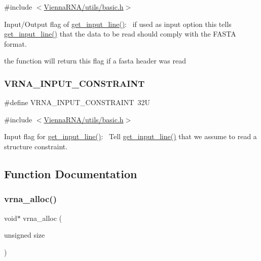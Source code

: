 {\ttfamily \#include $<$\mbox{\hyperlink{utils_2basic_8h}{Vienna\+R\+N\+A/utils/basic.\+h}}$>$}



Input/\+Output flag of \mbox{\hyperlink{group__utils_ga8ef1835eb83f542396f59f0b205965e5}{get\+\_\+input\+\_\+line()}}\+:~\newline
if used as input option this tells \mbox{\hyperlink{group__utils_ga8ef1835eb83f542396f59f0b205965e5}{get\+\_\+input\+\_\+line()}} that the data to be read should comply with the F\+A\+S\+TA format. 

the function will return this flag if a fasta header was read \mbox{\label{group__utils_gac08a9df45b9721b97a47dbfe7a6e5f85}} 
\subsubsection{\texorpdfstring{VRNA\_INPUT\_CONSTRAINT}{VRNA\_INPUT\_CONSTRAINT}}
{\footnotesize\ttfamily \#define V\+R\+N\+A\+\_\+\+I\+N\+P\+U\+T\+\_\+\+C\+O\+N\+S\+T\+R\+A\+I\+NT~32U}



{\ttfamily \#include $<$\mbox{\hyperlink{utils_2basic_8h}{Vienna\+R\+N\+A/utils/basic.\+h}}$>$}



Input flag for \mbox{\hyperlink{group__utils_ga8ef1835eb83f542396f59f0b205965e5}{get\+\_\+input\+\_\+line()}}\+:~\newline
Tell \mbox{\hyperlink{group__utils_ga8ef1835eb83f542396f59f0b205965e5}{get\+\_\+input\+\_\+line()}} that we assume to read a structure constraint. 



\subsection{Function Documentation}
\mbox{\label{group__utils_gaf37a0979367c977edfb9da6614eebe99}} 
\subsubsection{\texorpdfstring{vrna\_alloc()}{vrna\_alloc()}}
{\footnotesize\ttfamily void$\ast$ vrna\+\_\+alloc (\begin{DoxyParamCaption}\item[{unsigned}]{size }\end{DoxyParamCaption})}



